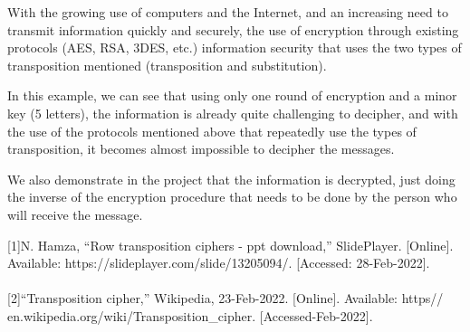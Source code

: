 \documentclass[twoside,twocolumn]{article}
\begin{document}
With the growing use of computers and the Internet, and an increasing need to transmit information quickly and securely, the use of encryption through existing protocols (AES, RSA, 3DES, etc.) information security that uses the two types of transposition mentioned (transposition and substitution).

In this example, we can see that using only one round of encryption and a minor key (5 letters), the information is already quite challenging to decipher, and with the use of the protocols mentioned above that repeatedly use the types of transposition, it becomes almost impossible to decipher the messages.

We also demonstrate in the project that the information is decrypted, just doing the inverse of the encryption procedure that needs to be done by the person who will receive the message. \\ 

\vspace*{1.5cm}
\begin{thebibliography}{} %

\footnotesize[1]N. Hamza, “Row transposition ciphers - ppt download,” SlidePlayer. [Online]. Available: https://slideplayer.com/slide/13205094/. [Accessed: 28-Feb-2022].  \\ \\

\footnotesize[2]“Transposition cipher,” Wikipedia, 23-Feb-2022. [Online]. Available: https\:// en.wikipedia.org/wiki/Transposition\_cipher. [Accessed-Feb-2022]. \\ \\


 
\end{thebibliography}


\end{document}
